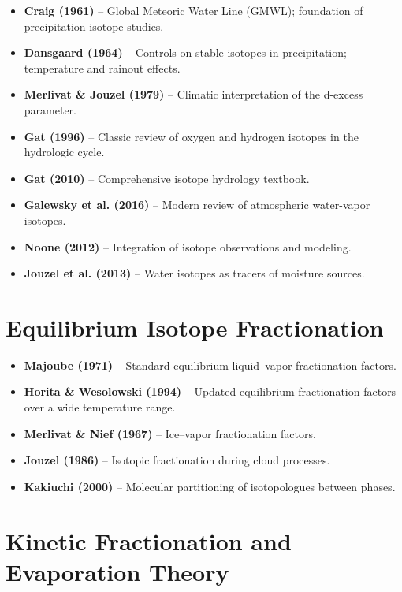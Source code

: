 \documentclass[11pt,a4paper]{article}
\begin{document}

\begin{itemize}
    \item \textbf{Craig (1961)} -- Global Meteoric Water Line (GMWL); foundation of precipitation isotope studies.
    \item \textbf{Dansgaard (1964)} -- Controls on stable isotopes in precipitation; temperature and rainout effects.
    \item \textbf{Merlivat \& Jouzel (1979)} -- Climatic interpretation of the d-excess parameter.
    \item \textbf{Gat (1996)} -- Classic review of oxygen and hydrogen isotopes in the hydrologic cycle.
    \item \textbf{Gat (2010)} -- Comprehensive isotope hydrology textbook.
    \item \textbf{Galewsky et al. (2016)} -- Modern review of atmospheric water-vapor isotopes.
    \item \textbf{Noone (2012)} -- Integration of isotope observations and modeling.
    \item \textbf{Jouzel et al. (2013)} -- Water isotopes as tracers of moisture sources.
\end{itemize}

\section{Equilibrium Isotope Fractionation}


\begin{itemize}
    \item \textbf{Majoube (1971)} -- Standard equilibrium liquid--vapor fractionation factors.
    \item \textbf{Horita \& Wesolowski (1994)} -- Updated equilibrium fractionation factors over a wide temperature range.
    \item \textbf{Merlivat \& Nief (1967)} -- Ice--vapor fractionation factors.
    \item \textbf{Jouzel (1986)} -- Isotopic fractionation during cloud processes.
    \item \textbf{Kakiuchi (2000)} -- Molecular partitioning of isotopologues between phases.
\end{itemize}

\section{Kinetic Fractionation and Evaporation Theory}
\end{document}
